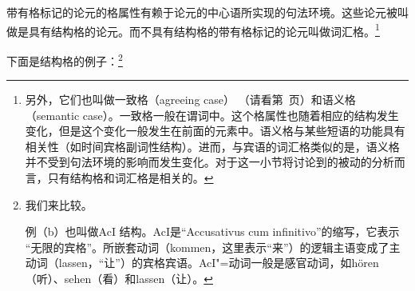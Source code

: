 带有格标记的论元的格属性有赖于论元的中心语所实现的句法环境。这些论元被叫做是具有结构格的论元。而不具有结构格的带有格标记的论元叫做词汇格。\footnote{%
另外，它们也叫做一致格（agreeing case） （请看第~\pageref{page-Kasuskongruenz}页）和语义格（semantic case）。一致格一般在谓词中。这个格属性也随着相应的结构发生变化，但是这个变化一般发生在前面的元素中。语义格与某些短语的功能具有相关性（如时间宾格副词性结构）。进而，与宾语的词汇格类似的是，语义格并不受到句法环境的影响而发生变化。对于这一小节将讨论到的被动的分析而言，只有结构格和词汇格是相关的。
}

下面是结构格的例子：\footnote{
我们来比较。

例（b）也叫做AcI 结构。AcI是“Accusativus cum infinitivo”的缩写，它表示 “无限的宾格”。所嵌套动词（kommen，这里表示“来”）的逻辑主语变成了主动词（lassen，“让”）的宾格宾语。AcI"=动词一般是感官动词，如hören（听）、sehen（看）和lassen（让）。
}

